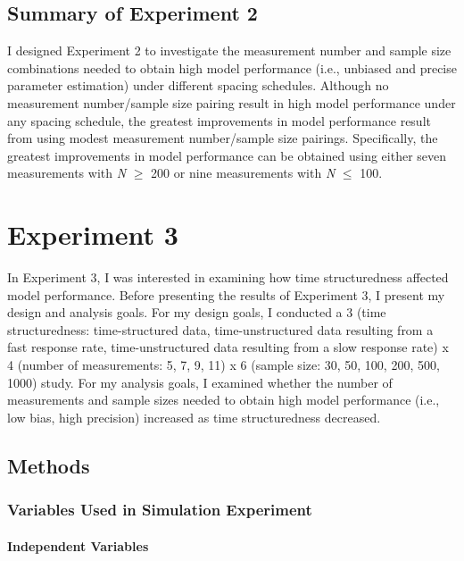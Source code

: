 \documentclass[
12pt, %
twoside,
english]{guelphthesis}
\begin{document}
\hypertarget{summary-of-experiment-2}{%
\section{Summary of Experiment 2}\label{summary-of-experiment-2}}

I designed Experiment 2 to investigate the measurement number and sample size combinations needed to obtain high model performance (i.e., unbiased and precise parameter estimation) under different spacing schedules. Although no measurement number/sample size pairing result in high model performance under any spacing schedule, the greatest improvements in model performance result from using modest measurement number/sample size pairings. Specifically, the greatest improvements in model performance can be obtained using either seven measurements with \emph{N} \(\ge\) 200 or nine measurements with \emph{N} \(\le\) 100.

\hypertarget{Exp3}{%
\chapter{Experiment 3}\label{Exp3}}

In Experiment 3, I was interested in examining how time structuredness affected model performance. Before presenting the results of Experiment 3, I present my design and analysis goals. For my design goals, I conducted a 3 (time structuredness: time-structured data, time-unstructured data resulting from a fast response rate, time-unstructured data resulting from a slow response rate) x 4 (number of measurements: 5, 7, 9, 11) x 6 (sample size: 30, 50, 100, 200, 500, 1000) study. For my analysis goals, I examined whether the number of measurements and sample sizes needed to obtain high model performance (i.e., low bias, high precision) increased as time structuredness decreased.

\hypertarget{methods-2}{%
\section{Methods}\label{methods-2}}

\hypertarget{variables-used-in-simulation-experiment-2}{%
\subsection{Variables Used in Simulation Experiment}\label{variables-used-in-simulation-experiment-2}}

\hypertarget{independent-variables-2}{%
\subsubsection{Independent Variables}\label{independent-variables-2}}
\end{document}
